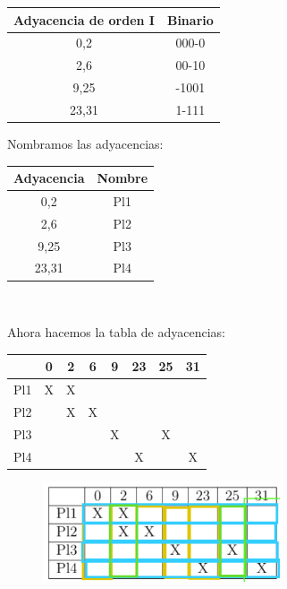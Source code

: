\documentclass[a4paper,12pt]{article}
\begin{document}
\begin{enumerate}[label=\textcolor{teal}{\textbf{\arabic*.}}]
    \begin{table} [H]
        \centering
        \begin{tabular}{|c|c|}
            \hline
            Adyacencia de orden I & Binario\\ \hline
            0,2 & 000-0 \\ \hline 
            2,6 & 00-10 \\ \hline 
            9,25 & -1001 \\ \hline   
            23,31 & 1-111 \\ \hline 
        \end{tabular}
    \end{table}
    Nombramos las adyacencias: \\

    \begin{table} [H]
        \centering
        \begin{tabular}{|c|c|}
            \hline
            Adyacencia & Nombre\\ \hline
            0,2 & Pl1 \\ \hline 
            2,6 & Pl2 \\ \hline 
            9,25 & Pl3 \\ \hline 
            23,31 & Pl4 \\ \hline 
        \end{tabular}\\
    \end{table}

    Ahora hacemos la tabla de adyacencias:
    \begin{table} [H]
        \centering
        \begin{tabular}{|c|c|c|c|c|c|c|c|}
            \hline
                & 0 & 2 & 6 & 9 & 23& 25 & 31 \\ \hline
            Pl1 & X & X &   &   &   &    &    \\ \hline 
            Pl2 &   & X & X &   &   &    &    \\ \hline 
            Pl3 &   &   &   & X &   & X  &    \\ \hline 
            Pl4 &   &   &   &   & X &    & X  \\ \hline 
        \end{tabular}
    \end{table}
    \hfill

    \begin{figure}[H]
        \centering
        \includegraphics[width=7cm]{img/10.png}
    \end{figure}


\end{enumerate}
\end{document}
